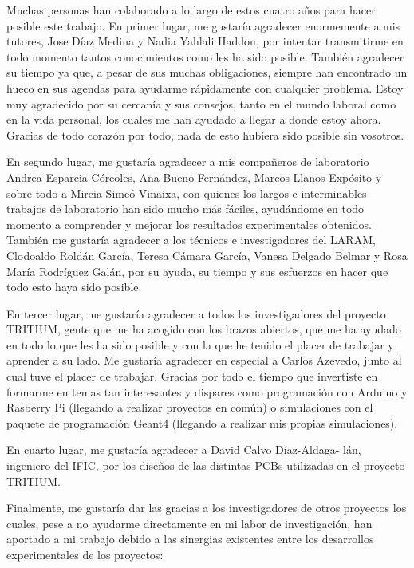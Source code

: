 Muchas personas han colaborado a lo largo de estos cuatro años para hacer posible este trabajo. En primer lugar, me gustaría agradecer enormemente a mis tutores, Jose Díaz Medina y Nadia Yahlali Haddou, por intentar transmitirme en todo momento tantos conocimientos como les ha sido posible. También agradecer su tiempo ya que, a pesar de sus muchas obligaciones, siempre han encontrado un hueco en sus agendas para ayudarme rápidamente con cualquier problema. Estoy muy agradecido por su cercanía y sus consejos, tanto en el mundo laboral como en la vida personal, los cuales me han ayudado a llegar a donde estoy ahora. Gracias de todo corazón por todo, nada de esto hubiera sido posible sin vosotros.

En segundo lugar, me gustaría agradecer a mis compañeros de laboratorio Andrea Esparcia Córcoles, Ana Bueno Fernández, Marcos Llanos Expósito y sobre todo a Mireia Simeó Vinaixa, con quienes los largos e interminables trabajos de laboratorio han sido mucho más fáciles, ayudándome en todo momento a comprender y mejorar los resultados experimentales obtenidos.  También me gustaría agradecer a los técnicos e investigadores del LARAM, Clodoaldo Roldán García, Teresa Cámara García, Vanesa Delgado Belmar y Rosa María Rodríguez Galán, por su ayuda, su tiempo y sus esfuerzos en hacer que todo esto haya sido posible.

En tercer lugar, me gustaría agradecer a todos los investigadores del proyecto TRITIUM, gente que me ha acogido con los brazos abiertos, que me ha ayudado en todo lo que les ha sido posible y con la que he tenido el placer de trabajar y aprender a su lado. Me gustaría agradecer en especial a Carlos Azevedo, junto al cual tuve el placer de trabajar. Gracias por todo el tiempo que invertiste en formarme en temas tan interesantes y dispares como programación con Arduino y Rasberry Pi (llegando a realizar proyectos en común) o simulaciones con el paquete de programación Geant4 (llegando a realizar mis propias simulaciones).

En cuarto lugar, me gustaría agradecer a David Calvo Díaz-Aldaga- lán, ingeniero del IFIC, por los diseños de las distintas PCBs utilizadas en el proyecto TRITIUM.

Finalmente, me gustaría dar las gracias a los investigadores de otros proyectos los cuales, pese a no ayudarme directamente en mi labor de investigación, han aportado a mi trabajo debido a las sinergias existentes entre los desarrollos experimentales de los proyectos:

